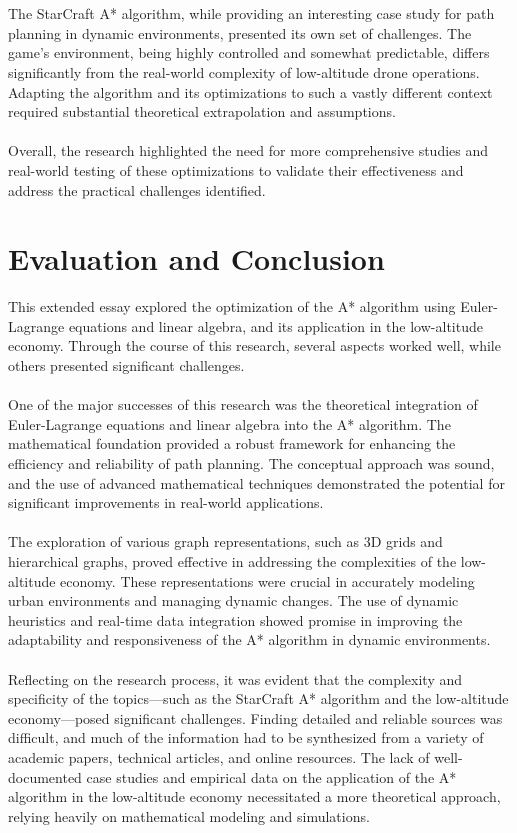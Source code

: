 \documentclass[12pt]{article}
\begin{document}
\\\\
The StarCraft A* algorithm, while providing an interesting case study for path planning in dynamic environments, presented its own set of challenges. The game's environment, being highly controlled and somewhat predictable, differs significantly from the real-world complexity of low-altitude drone operations. Adapting the algorithm and its optimizations to such a vastly different context required substantial theoretical extrapolation and assumptions.
\\\\
Overall, the research highlighted the need for more comprehensive studies and real-world testing of these optimizations to validate their effectiveness and address the practical challenges identified.
\newpage
\section{Evaluation and Conclusion}
This extended essay explored the optimization of the A* algorithm using Euler-Lagrange equations and linear algebra, and its application in the low-altitude economy. Through the course of this research, several aspects worked well, while others presented significant challenges.
\\\\
One of the major successes of this research was the theoretical integration of Euler-Lagrange equations and linear algebra into the A* algorithm. The mathematical foundation provided a robust framework for enhancing the efficiency and reliability of path planning. The conceptual approach was sound, and the use of advanced mathematical techniques demonstrated the potential for significant improvements in real-world applications.
\\\\
The exploration of various graph representations, such as 3D grids and hierarchical graphs, proved effective in addressing the complexities of the low-altitude economy. These representations were crucial in accurately modeling urban environments and managing dynamic changes. The use of dynamic heuristics and real-time data integration showed promise in improving the adaptability and responsiveness of the A* algorithm in dynamic environments.
\\\\
Reflecting on the research process, it was evident that the complexity and specificity of the topics—such as the StarCraft A* algorithm and the low-altitude economy—posed significant challenges. Finding detailed and reliable sources was difficult, and much of the information had to be synthesized from a variety of academic papers, technical articles, and online resources. The lack of well-documented case studies and empirical data on the application of the A* algorithm in the low-altitude economy necessitated a more theoretical approach, relying heavily on mathematical modeling and simulations.
\end{document}
